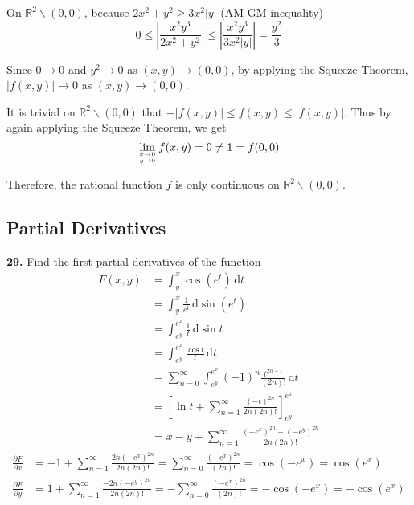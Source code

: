 \documentclass[a4paper,12pt]{article}
\newcommand{\ud}{\,\mathrm{d}}
\newcommand{\tho}[3][]{\frac{\partial #1 #2}{\partial #3 #1}}
\newcommand{\exercise}[1]{\noindent\textbf{#1.}}
\begin{document}
On $\mathbb{R}^2 \backslash (0, 0)$, because $2x^2 + y^2 \geq 3x^2 |y|$
(AM-GM inequality)
\[0 \leq \left|\frac{x^2 y^3}{2x^2 + y^2}\right|
    \leq \left|\frac{x^2 y^3}{3x^2 |y|}\right| = \frac{y^2}{3}\]

Since $0 \to 0$ and $y^2 \to 0$ as $(x, y) \to (0, 0)$,
by applying the Squeeze Theorem, $|f(x, y)| \to 0$ as
$(x, y) \to (0, 0)$.

It is trivial on $\mathbb{R}^2 \backslash (0, 0)$ that
$-|f(x, y)| \leq f(x, y) \leq |f(x, y)|$. Thus by again applying the
Squeeze Theorem, we get
\[\lim_{x\to 0 \atop y\to 0}f(x, y) = 0 \neq 1 = f(0, 0)\]

Therefore, the rational function $f$ is only continuous on
$\mathbb{R}^2 \backslash (0, 0)$.

\subsection{Partial Derivatives}
\exercise{29} Find the first partial derivatives of the function
\begin{align*}
  F(x, y) &= \int_y^x\cos\left(e^t\right)\ud t\\
          &= \int_y^x\frac{1}{e^t}\ud\sin\left(e^t\right)\\
          &= \int_{e^y}^{e^x}\frac{1}{t}\ud\sin t\\
          &= \int_{e^y}^{e^x}\frac{\cos t}{t}\ud t\\
          &= \sum_{n=0}^\infty\int_{e^y}^{e^x}
             (-1)^n\frac{t^{2n-1}}{(2n)!}\ud t\\
          &= \left[\ln t + \sum_{n=1}^\infty
             \frac{(-t)^{2n}}{2n(2n)!}\right]_{e^y}^{e^x}\\
          &= x - y + \sum_{n=1}^\infty
             \frac{\left(-e^x\right)^{2n} - \left(-e^y\right)^{2n}}{2n(2n)!}
\end{align*}
\begin{align*}
  \tho{F}{x}&
= -1 + \sum_{n=1}^\infty\frac{2n\left(-e^x\right)^{2n}}{2n(2n)!}
= \sum_{n=0}^\infty\frac{\left(-e^x\right)^{2n}}{(2n)!}
= \cos\left(-e^x\right)
= \cos\left(e^x\right)\\
  \tho{F}{y}&
= 1 + \sum_{n=1}^\infty\frac{-2n\left(-e^y\right)^{2n}}{2n(2n)!}
= -\sum_{n=0}^\infty\frac{\left(-e^x\right)^{2n}}{(2n)!}
= -\cos\left(-e^x\right)
= -\cos\left(e^x\right)
\end{align*}
\end{document}

